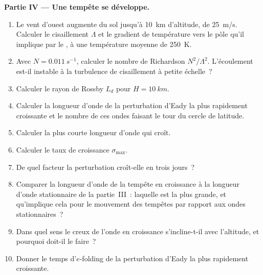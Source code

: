\begin{problem}
\medskip\noindent\textbf{Partie IV --- Une tempête se développe.}
\begin{enumerate}[resume]
\item Le vent d'ouest augmente du sol jusqu'à \qty{10}{km} d'altitude, de
  \qty{25}{m/s}. Calculer le cisaillement $\Lambda$ et le gradient de température
  vers le pôle qu'il implique par le , à une température moyenne de
  \qty{250}{K}.
\item Avec $N = \qty{0.011}{s^{-1}}$, calculer le nombre de Richardson
  $N^2/\Lambda^2$. L'écoulement est-il instable à la turbulence de cisaillement à petite échelle~?
\item Calculer le rayon de Rossby $L_d$ pour $H = \qty{10}{km}$.
\item Calculer la longueur d'onde de la perturbation d'Eady la plus rapidement croissante et
  le nombre de ces ondes faisant le tour du cercle de latitude.
\item Calculer la plus courte longueur d'onde qui croît.
\item Calculer le taux de croissance $\sigma_{\max}$.
\item De quel facteur la perturbation croît-elle en trois jours~?
\item Comparer la longueur d'onde de la tempête en croissance à la longueur
  d'onde stationnaire de la partie~III~: laquelle est la plus grande, et qu'implique cela pour le
  mouvement des tempêtes par rapport aux ondes stationnaires~?
\item Dans quel sens le creux de l'onde en croissance s'incline-t-il avec l'altitude, et
  pourquoi doit-il le faire~?
\item Donner le temps d'$e$-folding de la perturbation d'Eady la plus rapidement croissante.
\end{enumerate}
\end{problem}
